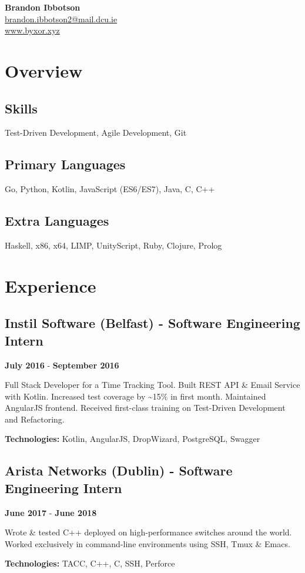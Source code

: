 \documentclass{article}
\newcommand{\youremail}[1]{\href{mailto:#1}{#1}}
\newcommand{\yourtitle}[3]{
  \begin{center}
    {\huge\bfseries #1}\\
    \vspace{.5em}
    \youremail{#2}\\
    \url{#3}\\
    \vspace{.7em}
  \end{center}
}
\begin{document}
\yourtitle{Brandon Ibbotson}{brandon.ibbotson2@mail.dcu.ie}{www.byxor.xyz}
\section{Overview}
\subsection{Skills}
Test-Driven Development, Agile Development, Git
\subsection{Primary Languages}
Go, Python, Kotlin, JavaScript (ES6/ES7), Java, C, C++
\subsection{Extra Languages}
Haskell, x86, x64, LIMP, UnityScript, Ruby, Clojure, Prolog
\section{Experience}
\subsection{Instil Software (Belfast) - Software Engineering Intern}
\textbf{July 2016} - \textbf{September 2016}

Full Stack Developer for a Time Tracking Tool. Built REST API \& Email Service with Kotlin. Increased test coverage by \textasciitilde{}15\% in first month. Maintained AngularJS frontend. Received first-class training on Test-Driven Development and Refactoring.

\textbf{Technologies: }Kotlin, AngularJS, DropWizard, PostgreSQL, Swagger
\vspace{0.5em}\subsection{Arista Networks (Dublin) - Software Engineering Intern}
\textbf{June 2017} - \textbf{June 2018}

Wrote \& tested C++ deployed on high-performance switches around the world. Worked exclusively in command-line environments using SSH, Tmux \& Emacs. 

\textbf{Technologies: }TACC, C++, C, SSH, Perforce
\vspace{0.5em}
\end{document}
